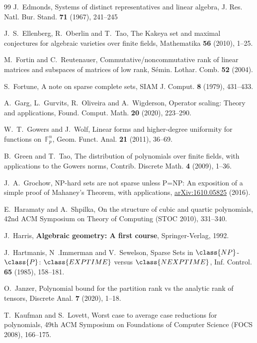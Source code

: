 \begin{thebibliography}{99}
J.~Edmonds, 
{Systems of distinct representatives and linear algebra},
{J. Res. Natl. Bur. Stand.} \textbf{71} (1967), 241--245

J.~S.~Ellenberg, R.~Oberlin and T.~Tao,
{The Kakeya set and maximal conjectures for algebraic varieties over finite fields},
{Mathematika} \textbf{56} (2010), 1--25.

M.~Fortin and C.~Reutenauer,
{Commutative/noncommutative rank of linear matrices and subspaces of matrices of low rank}, 
{S\'{e}min. Lothar. Comb.} \textbf{52} (2004).

S.~Fortune, 
{A note on sparse complete sets}, 
{SIAM J. Comput.} \textbf{8} (1979), 431--433.

A.~Garg, L.~Gurvits, R.~Oliveira and A.~Wigderson, 
{Operator scaling: Theory and applications}, 
{Found. Comput. Math.} \textbf{20} (2020), 223--290.

W.~T.~Gowers and J.~Wolf,
{Linear forms and higher-degree uniformity for functions on~{$\mathbb F^n_p$}}, 
{Geom. Funct. Anal.} \textbf{21} (2011), 36--69.

B.~Green and T.~Tao, 
{The distribution of polynomials over finite fields, with applications to the
	Gowers norms}, 
{Contrib. Discrete Math.} \textbf{4} (2009), 1--36.

J.~A.~Grochow, 
{NP-hard sets are not sparse unless P=NP: An exposition of a simple proof of Mahaney's Theorem, with applications},
\href{https://arxiv.org/abs/1610.05825}{arXiv:1610.05825} (2016).

E.~Haramaty and A.~Shpilka,
{On the structure of cubic and quartic polynomials}, 
{42nd ACM Symposium on Theory of Computing (STOC 2010)}, 331--340.

J.~Harris,
{\bf Algebraic geometry: A first course}, 
Springer-Verlag, 1992.

J.~Hartmanis, N~.Immerman and V.~Sewelson,
{Sparse Sets in $\class{NP}$-$\class{P}$: $\class{EXPTIME}$ versus $\class{NEXPTIME}$}, {Inf. Control.} \textbf{65} (1985), 158--181.

O.~Janzer,
{Polynomial bound for the partition rank vs the analytic rank of tensors},
{Discrete Anal.} \textbf{7} (2020), 1--18.

T.~Kaufman and S.~Lovett,
{Worst case to average case reductions for polynomials}, 
{49th ACM Symposium on Foundations of Computer Science (FOCS 2008)}, 166--175.


\end{thebibliography}

